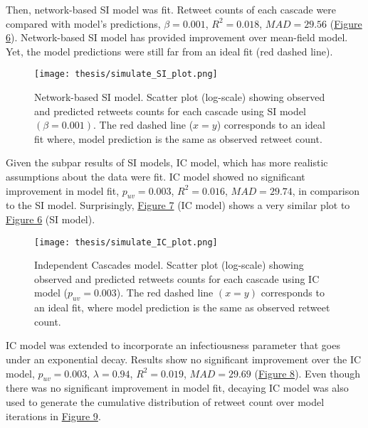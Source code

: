 \documentclass[11pt,a4paper]{article}
\begin{document}
    Then, network-based SI model was fit. Retweet counts of each cascade were compared with model's predictions, $\beta = 0.001$, $R^2 = 0.018$, $MAD = 29.56$ (\hyperlink{fig:SI}{Figure 6}). Network-based SI model has provided improvement over mean-field model. Yet, the model predictions were still far from an ideal fit (red dashed line).
    
    \begin{figure}[H]
        \hypertarget{fig:SI}{}
        \centering
        \texttt{[image: thesis/simulate\_SI\_plot.png]}\\
        \caption{Network-based SI model. Scatter plot (log-scale) showing observed and predicted retweets counts for each cascade using SI model $(\beta = 0.001)$. The red dashed line ($x=y$) corresponds to an ideal fit where, model prediction is the same as observed retweet count.}    
        \label{fig:enter-label}
    \end{figure}
    
    Given the subpar results of SI models, IC model, which has more realistic assumptions about the data were fit. IC model showed no significant improvement in model fit, $p_{uv} = 0.003$, $R^2 = 0.016$, $MAD = 29.74$, in comparison to the SI model. Surprisingly, \hyperlink{fig:IC}{Figure 7} (IC model) shows a very similar plot to \hyperlink{fig:SI}{Figure 6} (SI model).
    
    \begin{figure}[H]
        \hypertarget{fig:IC}{}
        \centering
        \texttt{[image: thesis/simulate\_IC\_plot.png]}\\
        \caption{Independent Cascades model. Scatter plot (log-scale) showing observed and predicted retweets counts for each cascade using IC model ($p_{uv} = 0.003$). The red dashed line $(x=y)$ corresponds to an ideal fit, where model prediction is the same as observed retweet count.}    
        \label{fig:enter-label}
    \end{figure}

    IC model was extended to incorporate an infectiousness parameter that goes under an exponential decay. Results show no significant improvement over the IC model, $p_{uv} = 0.003$, $\lambda = 0.94$, $R^2 = 0.019$, $MAD = 29.69$ (\hyperlink{fig:dec-IC}{Figure 8}). Even though there was no significant improvement in model fit, decaying IC model was also used to generate the cumulative distribution of retweet count over model iterations in \hyperlink{fig:ecdf-vs-iter}{Figure 9}.
    
\end{document}
